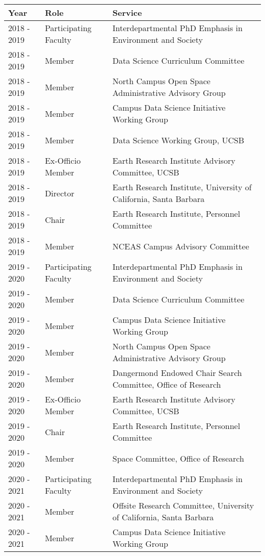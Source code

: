 
\begin{longtable}{llp{12cm}}
Year & Role & Service\\
\hline 
\endhead 
2018 - 2019 & Participating Faculty & Interdepartmental PhD Emphasis in Environment and Society \\
2018 - 2019 & Member & Data Science Curriculum Committee \\
2018 - 2019 & Member & North Campus Open Space Administrative Advisory Group \\
2018 - 2019 & Member & Campus Data Science Initiative Working Group \\
2018 - 2019 & Member & Data Science Working Group, UCSB \\
2018 - 2019 & Ex-Officio Member & Earth Research Institute Advisory Committee, UCSB \\
2018 - 2019 & Director & Earth Research Institute, University of California, Santa Barbara \\
2018 - 2019 & Chair & Earth Research Institute, Personnel Committee \\
2018 - 2019 & Member  & NCEAS Campus Advisory Committee  \\
2019 - 2020 & Participating Faculty & Interdepartmental PhD Emphasis in Environment and Society \\
2019 - 2020 & Member & Data Science Curriculum Committee \\
2019 - 2020 & Member & Campus Data Science Initiative Working Group \\
2019 - 2020 & Member & North Campus Open Space Administrative Advisory Group \\
2019 - 2020 & Member & Dangermond Endowed Chair Search Committee, Office of Research \\
2019 - 2020 & Ex-Officio Member & Earth Research Institute Advisory Committee, UCSB \\
2019 - 2020 & Chair & Earth Research Institute, Personnel Committee \\
2019 - 2020 & Member & Space Committee, Office of Research \\
2020 - 2021 & Participating Faculty & Interdepartmental PhD Emphasis in Environment and Society \\
2020 - 2021 & Member & Offsite Research Committee, University of California, Santa Barbara \\
2020 - 2021 & Member & Campus Data Science Initiative Working Group \\

\end{longtable}
